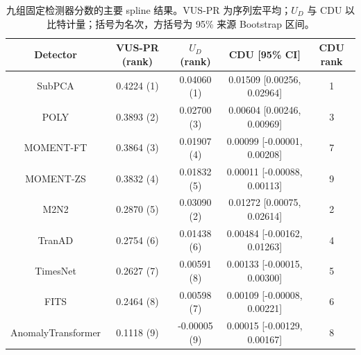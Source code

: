 \begin{table}[!t]
\centering
\small
\caption{九组固定检测器分数的主要 spline 结果。VUS-PR 为序列宏平均；$U_D$ 与 CDU 以比特计量；括号为名次，方括号为 95\% 来源 Bootstrap 区间。}
\label{tab:main}
\setlength{\tabcolsep}{7pt}
\begin{tabular}{ccccc}
\toprule
Detector & VUS-PR (rank) & $U_D$ (rank) & CDU [95\% CI] & CDU rank \\
\midrule
SubPCA & 0.4224 (1) & 0.04060 (1) & 0.01509 [0.00256, 0.02964] & 1 \\
POLY & 0.3893 (2) & 0.02700 (3) & 0.00604 [0.00246, 0.00969] & 3 \\
MOMENT-FT & 0.3864 (3) & 0.01907 (4) & 0.00099 [-0.00001, 0.00208] & 7 \\
MOMENT-ZS & 0.3832 (4) & 0.01832 (5) & 0.00011 [-0.00088, 0.00113] & 9 \\
M2N2 & 0.2870 (5) & 0.03090 (2) & 0.01272 [0.00075, 0.02614] & 2 \\
TranAD & 0.2754 (6) & 0.01438 (6) & 0.00484 [-0.00162, 0.01263] & 4 \\
TimesNet & 0.2627 (7) & 0.00591 (8) & 0.00133 [-0.00015, 0.00300] & 5 \\
FITS & 0.2464 (8) & 0.00598 (7) & 0.00109 [-0.00008, 0.00221] & 6 \\
AnomalyTransformer & 0.1118 (9) & -0.00005 (9) & 0.00015 [-0.00129, 0.00167] & 8 \\
\bottomrule
\end{tabular}
\end{table}
